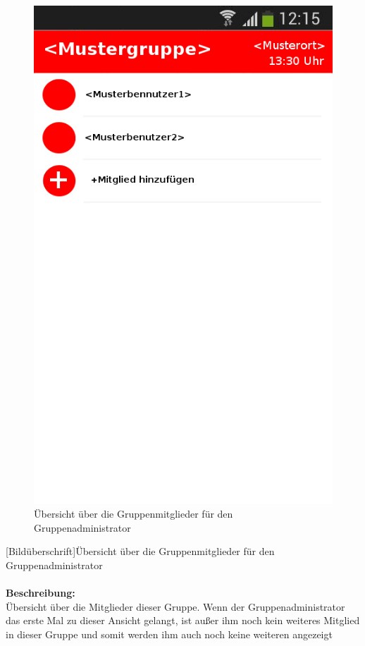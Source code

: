 \begin{figure} [H]
	\caption{Übersicht über die Gruppenmitglieder für den Gruppenadministrator}
\begin{center}
	\includegraphics[scale =0.5]{resources/images/gruppendetails_Admin.png}
\end{center}
\end{figure}
[Bildüberschrift]Übersicht über die Gruppenmitglieder für den Gruppenadministrator\\ \\
\textbf{Beschreibung:}\\
Übersicht über die Mitglieder dieser Gruppe. Wenn der Gruppenadministrator das erste Mal zu dieser Ansicht gelangt, ist außer ihm noch kein weiteres Mitglied in dieser Gruppe und somit werden ihm auch noch keine weiteren angezeigt\\
